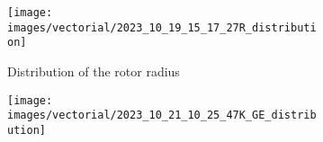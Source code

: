 \documentclass[11pt, a4paper]{article}
\begin{document}
\begin{figure}[H]
  \centering
  \begin{subfigure}{0.65\columnwidth}
    \centering
    \texttt{[image: images/vectorial/2023\_10\_19\_15\_17\_27R\_distribution]}
    \caption{Distribution of the rotor radius}
    \label{fig:R_distribution}
  \end{subfigure}
  \begin{subfigure}{0.65\columnwidth}
    \centering
    \texttt{[image: images/vectorial/2023\_10\_21\_10\_25\_47K\_GE\_distribution]}
    \label{fig:K_GE_distribution}
  \end{subfigure}
\end{figure}
\end{document}
